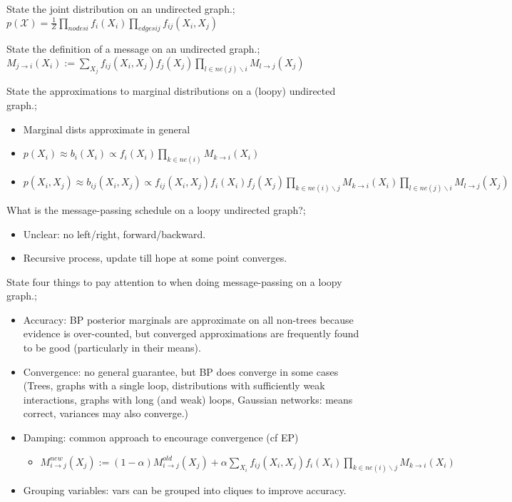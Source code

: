 \documentclass{article}
\begin{document}
State the joint distribution on an undirected graph.; $p(\mathcal{X}) = \frac{1}{Z}\prod_{nodes i}f_i(X_i)\prod_{edges ij}f_{ij}(X_i, X_j)$

State the definition of a message on an undirected graph.; $M_{j\rightarrow i}(X_i) := \sum_{X_j}f_{ij}(X_i, X_j)f_j(X_j)\prod_{l\in ne(j) \backslash i}M_{l\rightarrow j}(X_j)$

State the approximations to marginal distributions on a (loopy) undirected graph.; \begin{itemize} \item Marginal dists approximate in general \item $p(X_i)\approx b_i(X_i) \propto f_i(X_i)\prod_{k\in ne(i) }M_{k\rightarrow i}(X_i)$ \item $p(X_i, X_j) \approx b_{ij}(X_i, X_j) \propto f_{ij}(X_i, X_j)f_i(X_i)f_j(X_j)\prod_{k\in ne(i)\backslash j}M_{k\rightarrow i}(X_i)\prod_{l\in ne(j)\backslash i}M_{l\rightarrow j}(X_j)$ \end{itemize} 

What is the message-passing schedule on a loopy undirected graph?; \begin{itemize} \item Unclear: no left/right, forward/backward. \item Recursive process, update till hope at some point converges. \end{itemize}

State four things to pay attention to when doing message-passing on a loopy graph.; \begin{itemize} \item Accuracy: BP posterior marginals are approximate on all non-trees because evidence is over-counted, but converged approximations are frequently found to be good (particularly in their means). \item Convergence: no general guarantee, but BP does converge in some cases (Trees, graphs with a single loop, distributions with sufficiently weak interactions, graphs with long (and weak) loops, Gaussian networks: means correct, variances may also converge.) \item Damping: common approach to encourage convergence (cf EP) \begin{itemize} \item $M^{new}_{i\rightarrow j}(X_j):= (1-\alpha)M^{old}_{i\rightarrow j}(X_j) + \alpha\sum_{X_i}f_{ij}(X_i, X_j)f_i(X_i)\prod_{k\in ne(i)\backslash j}M_{k\rightarrow i}(X_i)$ \end{itemize} \item Grouping variables: vars can be grouped into cliques to improve accuracy. \end{itemize}
\end{document}
